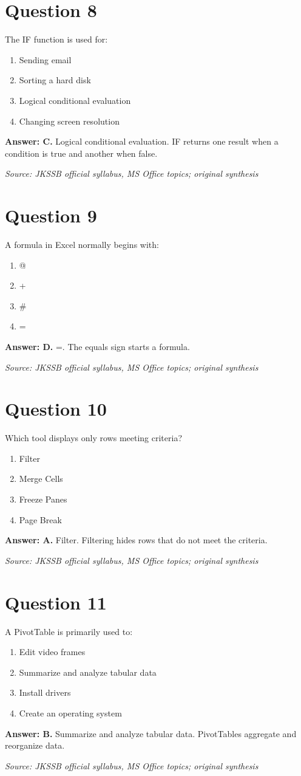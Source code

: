\documentclass[11pt,a4paper]{book}
\newcommand{\source}[1]{\par\smallskip\textit{Source: #1}}
\newcommand{\answer}[2]{\par\textbf{Answer: #1.} #2}
\begin{document}
\section*{Question 8}
The IF function is used for:
\begin{enumerate}[label=\Alph*.]
\item Sending email
\item Sorting a hard disk
\item Logical conditional evaluation
\item Changing screen resolution
\end{enumerate}
\answer{C}{Logical conditional evaluation. IF returns one result when a condition is true and another when false.}
\source{JKSSB official syllabus, MS Office topics; original synthesis}
\section*{Question 9}
A formula in Excel normally begins with:
\begin{enumerate}[label=\Alph*.]
\item @
\item +
\item \#
\item =
\end{enumerate}
\answer{D}{=. The equals sign starts a formula.}
\source{JKSSB official syllabus, MS Office topics; original synthesis}
\section*{Question 10}
Which tool displays only rows meeting criteria?
\begin{enumerate}[label=\Alph*.]
\item Filter
\item Merge Cells
\item Freeze Panes
\item Page Break
\end{enumerate}
\answer{A}{Filter. Filtering hides rows that do not meet the criteria.}
\source{JKSSB official syllabus, MS Office topics; original synthesis}
\section*{Question 11}
A PivotTable is primarily used to:
\begin{enumerate}[label=\Alph*.]
\item Edit video frames
\item Summarize and analyze tabular data
\item Install drivers
\item Create an operating system
\end{enumerate}
\answer{B}{Summarize and analyze tabular data. PivotTables aggregate and reorganize data.}
\source{JKSSB official syllabus, MS Office topics; original synthesis}
\end{document}
